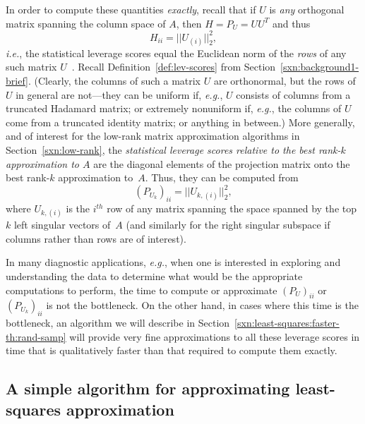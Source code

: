 \documentclass[twoside]{article}
\begin{document}
In order to compute these quantities \emph{exactly}, recall that if $U$ is 
\emph{any} orthogonal matrix spanning the column space of $A$, then 
$H=P_U=UU^T$ and thus 
$$
H_{ii}=||U_{(i)}||_2^2  , 
$$
\emph{i.e.}, the statistical leverage scores equal the Euclidean norm of 
the \emph{rows} of any such matrix $U$~\cite{DMM08_CURtheory_JRNL,CUR_PNAS}.
Recall Definition~\ref{def:lev-scores} from 
Section~\ref{sxn:background1-brief}.
(Clearly, the columns of such a matrix $U$ are orthonormal, but the rows of 
$U$ in general are not---they can be uniform if, \emph{e.g.}, $U$ consists 
of columns from a truncated Hadamard matrix; or extremely nonuniform if, 
\emph{e.g.}, the columns of $U$ come from a truncated identity matrix; or 
anything in between.)
More generally, and of interest for the low-rank matrix approximation 
algorithms in Section~\ref{sxn:low-rank}, the \emph{statistical leverage 
scores relative to the best rank-$k$ approximation to $A$} are the diagonal 
elements of the projection matrix onto the best rank-$k$ approximation 
to~$A$. 
Thus, they can be computed from 
$$
(P_{U_k})_{ii} = ||U_{k,(i)}||_2^2  , 
$$
where $U_{k,(i)}$ is the $i^{th}$ row of any
matrix spanning the space spanned by the top $k$ left singular vectors 
of~$A$ (and similarly for the right singular subspace if columns rather than 
rows are of interest).

In many diagnostic applications, \emph{e.g.}, when one is interested in 
exploring and understanding the data to determine what would be the 
appropriate computations to perform, the time to compute or approximate 
$(P_{U})_{ii}$ or $(P_{U_k})_{ii}$ is not the bottleneck.
On the other hand, in cases where this time is the bottleneck, an algorithm 
we will describe in Section~\ref{sxn:least-squares:faster-th:rand-samp}
will provide very fine approximations to all these 
leverage scores in time that is qualitatively faster than that required to 
compute them exactly.


\subsection{A simple algorithm for approximating least-squares approximation}
\label{sxn:least-squares:algorithm}
\end{document}
